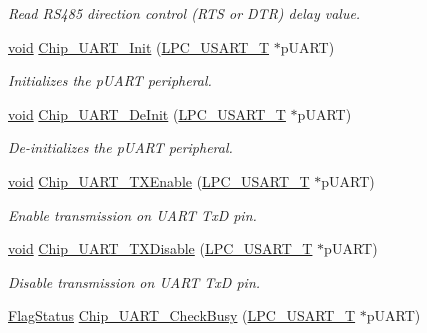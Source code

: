 \begin{DoxyCompactItemize}
\begin{DoxyCompactList}\small\item\em Read R\-S485 direction control (R\-T\-S or D\-T\-R) delay value. \end{DoxyCompactList}\item 
\hyperlink{Paradigm_2Tern__EE_2small_2portmacro_8h_a14d32f8130d3c0b212cfc751730b5b49}{void} \hyperlink{group__UART__17XX__40XX_gaf024084be4068e407aab7c30e105f7af}{Chip\-\_\-\-U\-A\-R\-T\-\_\-\-Init} (\hyperlink{structLPC__USART__T}{L\-P\-C\-\_\-\-U\-S\-A\-R\-T\-\_\-\-T} $\ast$p\-U\-A\-R\-T)
\begin{DoxyCompactList}\small\item\em Initializes the p\-U\-A\-R\-T peripheral. \end{DoxyCompactList}\item 
\hyperlink{Paradigm_2Tern__EE_2small_2portmacro_8h_a14d32f8130d3c0b212cfc751730b5b49}{void} \hyperlink{group__UART__17XX__40XX_gaa18c4ebd4be27643e6f848472e778989}{Chip\-\_\-\-U\-A\-R\-T\-\_\-\-De\-Init} (\hyperlink{structLPC__USART__T}{L\-P\-C\-\_\-\-U\-S\-A\-R\-T\-\_\-\-T} $\ast$p\-U\-A\-R\-T)
\begin{DoxyCompactList}\small\item\em De-\/initializes the p\-U\-A\-R\-T peripheral. \end{DoxyCompactList}\item 
\hyperlink{Paradigm_2Tern__EE_2small_2portmacro_8h_a14d32f8130d3c0b212cfc751730b5b49}{void} \hyperlink{group__UART__17XX__40XX_gafe3fef953086848a51b8ec148c9fff2a}{Chip\-\_\-\-U\-A\-R\-T\-\_\-\-T\-X\-Enable} (\hyperlink{structLPC__USART__T}{L\-P\-C\-\_\-\-U\-S\-A\-R\-T\-\_\-\-T} $\ast$p\-U\-A\-R\-T)
\begin{DoxyCompactList}\small\item\em Enable transmission on U\-A\-R\-T Tx\-D pin. \end{DoxyCompactList}\item 
\hyperlink{Paradigm_2Tern__EE_2small_2portmacro_8h_a14d32f8130d3c0b212cfc751730b5b49}{void} \hyperlink{group__UART__17XX__40XX_ga96589453d52bc5e208ffbeced9a49dab}{Chip\-\_\-\-U\-A\-R\-T\-\_\-\-T\-X\-Disable} (\hyperlink{structLPC__USART__T}{L\-P\-C\-\_\-\-U\-S\-A\-R\-T\-\_\-\-T} $\ast$p\-U\-A\-R\-T)
\begin{DoxyCompactList}\small\item\em Disable transmission on U\-A\-R\-T Tx\-D pin. \end{DoxyCompactList}\item 
\hyperlink{group__LPC__Types__Public__Types_ga89136caac2e14c55151f527ac02daaff}{Flag\-Status} \hyperlink{group__UART__17XX__40XX_ga1b5b93f60a5b0a28e5af5f3f3311bcba}{Chip\-\_\-\-U\-A\-R\-T\-\_\-\-Check\-Busy} (\hyperlink{structLPC__USART__T}{L\-P\-C\-\_\-\-U\-S\-A\-R\-T\-\_\-\-T} $\ast$p\-U\-A\-R\-T)

\end{DoxyCompactItemize}

